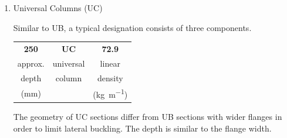 \begin{enumerate}[itemsep=1em]
\begin{minipage}[t]{5cm}
\end{minipage}
\item Universal Columns (UC)\qquad\ASNZSSTEEL{~}\\[1em]
\begin{minipage}[t]{9cm}
Similar to UB, a typical designation consists of three components.
\begin{table}[H]\centering
\begin{tabular}{ccc}
	\textbf{250} & \textbf{UC} &       \textbf{72.9}        \\
	  approx.    &  universal  &           linear           \\
	   depth     &   column    &          density           \\
	 (\si{\mm})  &             & (\si{\kilogram\per\meter})
\end{tabular}
\end{table}
The geometry of UC sections differ from UB sections with wider flanges in order to limit lateral buckling. The depth is similar to the flange width.


\end{minipage}
\end{enumerate}

